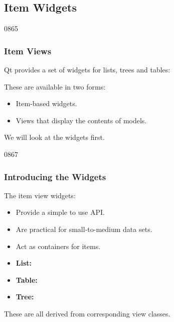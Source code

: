 %
%
%
%

\subsection{Item Widgets}

\begin{slide}[fragile]{0865}\frametitle{Item Views}
Qt provides a set of widgets for lists, trees and tables:

\vspace*{1em}

\vspace*{1em}
These are available in two forms:

\begin{itemize}
\item Item-based widgets.
\item Views that display the contents of models.
\end{itemize}

We will look at the widgets first.
\end{slide}

\begin{slide}[fragile]{0867}\frametitle{Introducing the Widgets}
  \label{introduction_to_model_view_widgets}

The item view widgets:

\begin{itemize}
\item Provide a simple to use API.
\item Are practical for small-to-medium data sets.
\item Act as containers for items.
\end{itemize}

\begin{itemize}
\item \textbf{List:} 
\item \textbf{Table:} 
\item \textbf{Tree:} 
\end{itemize}

These are all derived from corresponding view classes.
\end{slide}

